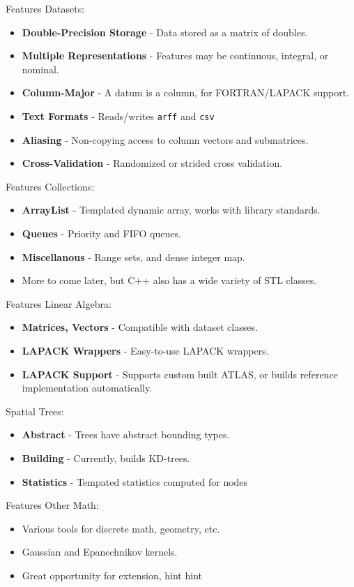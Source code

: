 \documentclass[pdf,colorBG,slideColor]{prosper}
\newcommand{\itemt}[1]{\item {\bf #1} -}
\begin{document}
\begin{slide}{Features}
 Datasets:
 \begin{itemize}
 \itemt{Double-Precision Storage} Data stored as a matrix of doubles.
 \itemt{Multiple Representations} Features may be continuous, integral, or nominal.
 \itemt{Column-Major} A datum is a column, for FORTRAN/LAPACK support.
 \itemt{Text Formats} Reads/writes {\tt arff} and {\tt csv}
 \itemt{Aliasing} Non-copying access to column vectors and submatrices.
 \itemt{Cross-Validation} Randomized or strided cross validation.
 \end{itemize}
\end{slide}

\begin{slide}{Features}
 Collections:
 \begin{itemize}
 \itemt{ArrayList} Templated dynamic array, works with library standards.
 \itemt{Queues} Priority and FIFO queues.
 \itemt{Miscellanous} Range sets, and dense integer map.
 \item More to come later, but C++ also has a wide variety of STL classes.
 \end{itemize}
\end{slide}

\begin{slide}{Features}
 Linear Algebra:
 \begin{itemize}
 \itemt{Matrices, Vectors} Compatible with dataset classes.
 \itemt{LAPACK Wrappers} Easy-to-use LAPACK wrappers.
 \itemt{LAPACK Support}
 Supports custom built ATLAS, or builds reference implementation automatically.
 \end{itemize}
 \vspace*{.2in}
 Spatial Trees:
 \begin{itemize}
 \itemt{Abstract} Trees have abstract bounding types.
 \itemt{Building} Currently, builds KD-trees.
 \itemt{Statistics} Tempated statistics computed for nodes
 \end{itemize}
\end{slide}

\begin{slide}{Features}
 Other Math: \\
 \begin{itemize}
 \item Various tools for discrete math, geometry, etc.
 \item Gaussian and Epanechnikov kernels.
 \item Great opportunity for extension, hint hint
 \end{itemize}
\end{slide}
\end{document}
